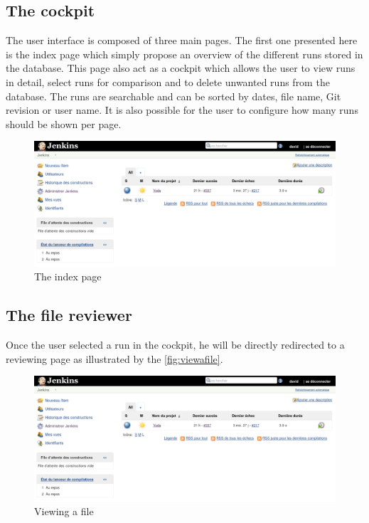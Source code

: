 \subsection{The cockpit}
The user interface is composed of three main pages. The first one presented here is the index page which simply propose an overview of the different runs stored in the database. This page also act as a cockpit which allows the user to view runs in detail, select runs for comparison and to delete unwanted runs from the database. The runs are searchable and can be sorted by dates, file name, Git revision or user name. It is also possible for the user to configure how many runs should be shown per page.
\begin{figure}[h!]
  \centering
    \includegraphics[width=\textwidth]{figures/jenkins.png}
    \caption{The index page}
    \label{fig:jenkins}
\end{figure}

\subsection{The file reviewer}
Once the user selected a run in the cockpit, he will be directly redirected to a reviewing page as illustrated by the \autoref{fig:viewafile}. 
\begin{figure}[h!]
  \centering
    \includegraphics[width=\textwidth]{figures/jenkins.png}
    \caption{Viewing a file}
    \label{fig:viewafile}
\end{figure}

